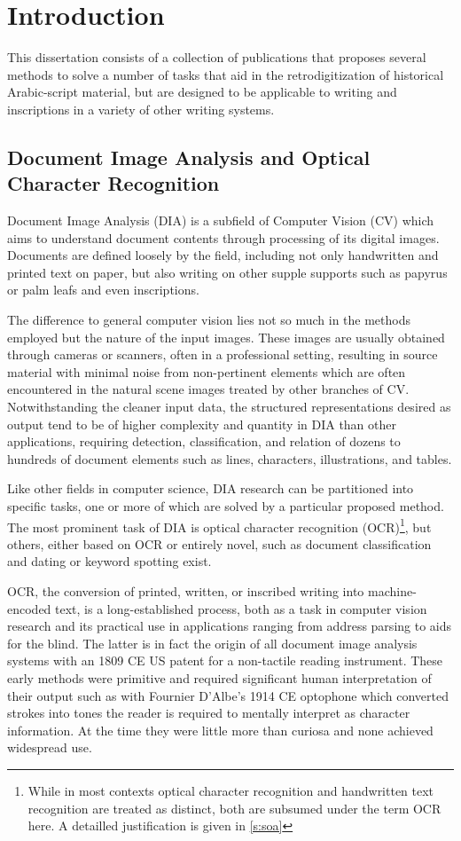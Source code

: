 \chapter{Introduction}

This dissertation consists of a collection of publications that proposes
several methods to solve a number of tasks that aid in the retrodigitization of
historical Arabic-script material, but are designed to be applicable to writing
and inscriptions in a variety of other writing systems. 

\section{Document Image Analysis and Optical Character Recognition}

Document Image Analysis (DIA) is a subfield of Computer Vision (CV) which aims
to understand document contents through processing of its digital images.
Documents are defined loosely by the field, including not only handwritten and
printed text on paper, but also writing on other supple supports such as
papyrus or palm leafs and even inscriptions.

The difference to general computer vision lies not so much in the methods
employed but the nature of the input images. These images are usually obtained
through cameras or scanners, often in a professional setting, resulting in
source material with minimal noise from non-pertinent elements which are often
encountered in the natural scene images treated by other branches of CV.
Notwithstanding the cleaner input data, the structured representations desired
as output tend to be of higher complexity and quantity in DIA than other
applications, requiring detection, classification, and relation of dozens to
hundreds of document elements such as lines, characters, illustrations, and
tables. 

Like other fields in computer science, DIA research can be partitioned into
specific tasks, one or more of which are solved by a particular proposed
method. The most prominent task of DIA is optical character recognition
(OCR)\footnote{While in most contexts optical character recognition and
handwritten text recognition are treated as distinct, both are subsumed under
the term OCR here. A detailled justification is given in \ref{s:soa}}, but
others, either based on OCR or entirely novel, such as document classification
and dating or keyword spotting exist.

OCR, the conversion of printed, written, or inscribed writing into
machine-encoded text, is a long-established process, both as a task in computer
vision research and its practical use in applications ranging from address
parsing to aids for the blind. The latter is in fact the origin of all document
image analysis systems with an 1809 CE US patent for a non-tactile reading
instrument. These early methods were primitive and required significant human
interpretation of their output such as with Fournier D'Albe's 1914 CE optophone
which converted strokes into tones the reader is required to mentally interpret
as character information. At the time they were little more than curiosa and
none achieved widespread use. 

